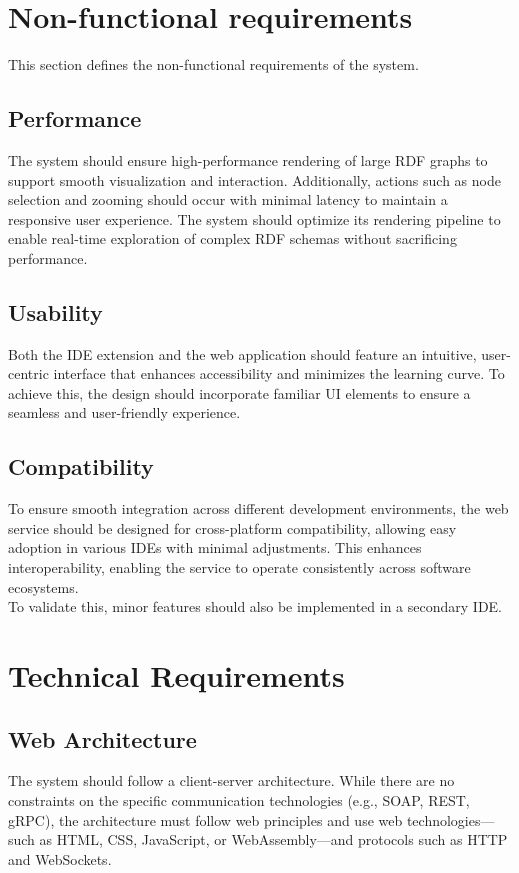 \section{Non-functional requirements\label{sec:techreq}}
This section defines the non-functional requirements of the system.

\subsection{Performance\label{sec:reqsuba}}
The system should ensure high-performance rendering of large RDF graphs to support smooth visualization and interaction. Additionally, actions such as node selection and zooming should occur with minimal latency to maintain a responsive user experience. The system should optimize its rendering pipeline to enable real-time exploration of complex RDF schemas without sacrificing performance.

\subsection{Usability\label{sec:reqsuba}}
Both the IDE extension and the web application should feature an intuitive, user-centric interface that enhances accessibility and minimizes the learning curve. To achieve this, the design should incorporate familiar UI elements to ensure a seamless and user-friendly experience.

\subsection{Compatibility\label{sec:reqsuba}}
To ensure smooth integration across different development environments, the web service should be designed for cross-platform compatibility, allowing easy adoption in various IDEs with minimal adjustments. This enhances interoperability, enabling the service to operate consistently across software ecosystems.
\\
To validate this, minor features should also be implemented in a secondary IDE.

\section{Technical Requirements\label{sec:techreq}}

\subsection{Web Architecture\label{sec:reqsuba}}
The system should follow a client-server architecture. While there are no constraints on the specific communication technologies (e.g., SOAP, REST, gRPC), the architecture must follow web principles and use web technologies—such as HTML, CSS, JavaScript, or WebAssembly—and protocols such as HTTP and WebSockets.

